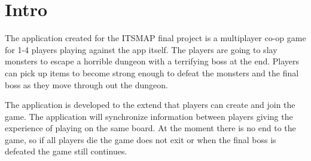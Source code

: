 \pagestyle{Uni}

\chapter{Intro}
The application created for the ITSMAP final project is a multiplayer co-op game for 1-4 players playing against the app itself. The players are going to slay monsters to escape a horrible dungeon with a terrifying boss at the end. Players can pick up items to  become strong enough to defeat the monsters and the final boss as they move through out the dungeon.

The application is developed to the extend that players can create and join the game. The application will synchronize information between players giving the experience of playing on the same board. At the moment there is no end to the game, so if all players die the game does not exit or when the final boss is defeated the game still continues.